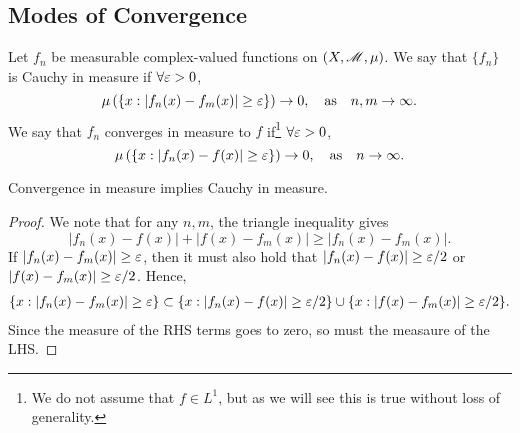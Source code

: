 \documentclass[12pt]{article} %
\begin{document}
\subsection{Modes of Convergence}

\begin{definition}
    Let $f_n$ be measurable complex-valued functions on $(X, \mathscr{M}, \mu)$. We say that $\{f_n\}$ is Cauchy in measure if $\forall \varepsilon > 0$, \[\mu\left(\{x : |f_n(x) - f_m(x)| \geq \varepsilon\}\right) \to 0, \ \ \ \text{as} \ \ \ n,m \to \infty.\] We say that $f_n$ converges in measure to $f$ if\footnote{We do not assume that $f \in L^1$, but as we will see this is true without loss of generality.} $\forall \varepsilon > 0$, \[\mu\left(\{x : |f_n(x) - f(x)| \geq \varepsilon\}\right) \to 0, \ \ \ \text{as} \ \ \ n \to \infty.\]
\end{definition}

\begin{proposition}
    Convergence in measure implies Cauchy in measure.
\end{proposition}

\begin{proof}
    We note that for any $n, m$, the triangle inequality gives \[|f_n(x) - f(x)| + |f(x) - f_m(x)| \geq |f_n(x) - f_m(x)|.\] If $|f_n(x) - f_m(x)| \geq \varepsilon$, then it must also hold that $|f_n(x) - f(x)| \geq \varepsilon / 2$ or $|f(x) - f_m(x)| \geq \varepsilon / 2$. Hence, \begin{align*}
        \{x : |f_n(x) - f_m(x)| \geq \varepsilon\} \subset \{x : |f_n(x) - f(x)| \geq \varepsilon/2\} \cup \{x : |f(x) - f_m(x)| \geq \varepsilon/2\}.
    \end{align*}
    Since the measure of the RHS terms goes to zero, so must the measaure of the LHS.
\end{proof}
\end{document}
